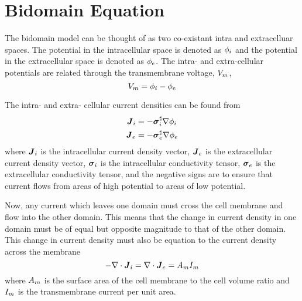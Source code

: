 \section{Bidomain Equation}
\label{sec:Bidomain}

The bidomain model \citep{henriquez:1993} can be thought of as two
co-existant intra and extracelluar spaces. The potential in the
intracellular space is denoted as $ { \phi }_{i} $ and the
potential in the extracellular space is denoted as
$ { \phi }_{e} $. The intra- and extra-cellular potentials are
related through the transmembrane voltage, $ { V }_{m} $,
\ie
\begin{equation}
  \transmembranevoltage=\intracellularpotential-\extracellularpotential
  \label{eqn:TransMembraneVoltageDefinition}
\end{equation} 

The intra- and extra- cellular current densities can be found from
\begin{align}
  \intracellularcurrentdensityvector&=
  -\sharptensor{\intracellularconductivitytensor}\gradient{}{\intracellularpotential}
  \label{eqn:IntraCellularCurrentDensityVectorDefinition} \\
  \extracellularcurrentdensityvector&=
  -\sharptensor{\extracellularconductivitytensor}\gradient{}{\extracellularpotential}
  \label{eqn:ExtraCellularCurrentDensityVectorDefinition}  
\end{align}
where $ {  \boldsymbol{J}  }_{i} $ is the intracellular
current density vector, $ {  \boldsymbol{J}  }_{e} $ is the
extracellular current density vector,
$ { \boldsymbol{\mathit{ \sigma }} }_{i} $ is the intracellular conductivity
tensor, $ { \boldsymbol{\mathit{ \sigma }} }_{e} $ is the extracellular
conductivity tensor, and the negative signs are to ensure that current
flows from areas of high potential to areas of low potential.

Now, any current which leaves one domain must cross the cell membrane
and flow into the other domain. This means that the change in current
density in one domain must be of equal but opposite magnitude to that
of the other domain. This change in current density must also be
equation to the current density across the membrane \ie
\begin{equation}
  -\divergence{}{\intracellularcurrentdensityvector}=
  \divergence{}{\extracellularcurrentdensityvector}=
  \membraneareavolumeratio\transmembranecurrent
  \label{eqn:BidomainConservationOfCurrent}
\end{equation}
where $ A_{m} $ is the surface area of the cell
membrane to the cell volume ratio and $ { I }_{m} $ is the
transmembrane current per unit area.


